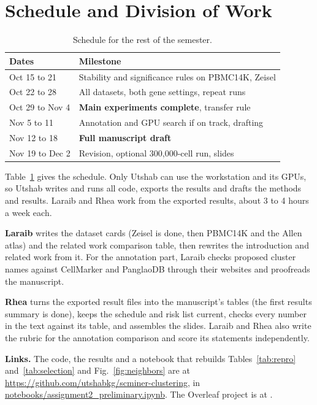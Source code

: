 \section{Schedule and Division of Work}\label{sec:schedule}
\begin{table}[t]
\centering
\caption{Schedule for the rest of the semester.}
\label{tab:schedule}
\footnotesize
\setlength{\tabcolsep}{4pt}
\begin{tabular}{p{}p{}}
\toprule
Dates & Milestone \\
\midrule
Oct 15 to 21 & Stability and significance rules on PBMC14K, Zeisel \\
Oct 22 to 28 & All datasets, both gene settings, repeat runs \\
Oct 29 to Nov 4 & \textbf{Main experiments complete}, transfer rule \\
Nov 5 to 11 & Annotation and GPU search if on track, drafting \\
Nov 12 to 18 & \textbf{Full manuscript draft} \\
Nov 19 to Dec 2 & Revision, optional 300,000-cell run, slides \\
\bottomrule
\end{tabular}
\end{table}

Table~\ref{tab:schedule} gives the schedule. Only Utshab can use the workstation and its GPUs, so Utshab writes and runs all code, exports the results and drafts the methods and results. Laraib and Rhea work from the exported results, about 3 to 4 hours a week each.

\textbf{Laraib} writes the dataset cards (Zeisel is done, then PBMC14K and the Allen atlas) and the related work comparison table, then rewrites the introduction and related work from it. For the annotation part, Laraib checks proposed cluster names against CellMarker and PanglaoDB \cite{hu2023cellmarker,franzen2019panglaodb} through their websites and proofreads the manuscript.

\textbf{Rhea} turns the exported result files into the manuscript's tables (the first results summary is done), keeps the schedule and risk list current, checks every number in the text against its table, and assembles the slides. Laraib and Rhea also write the rubric for the annotation comparison and score its statements independently.

\textbf{Links.} The code, the results and a notebook that rebuilds Tables~\ref{tab:repro} and~\ref{tab:selection} and Fig.~\ref{fig:neighbors} are at \url{https://github.com/utshabkg/scminer-clustering}, in \url{notebooks/assignment2_preliminary.ipynb}. The Overleaf project is at \overleaflink.
